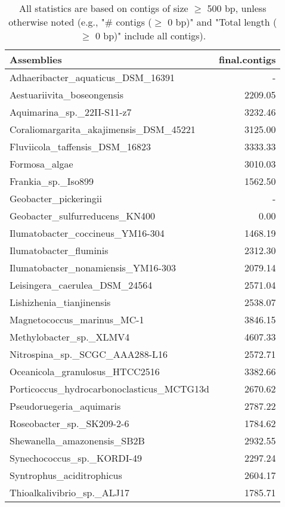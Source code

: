 \documentclass[12pt,a4paper]{article}
\begin{document}
\begin{table}[ht]
\begin{center}
\caption{All statistics are based on contigs of size $\geq$ 500 bp, unless otherwise noted (e.g., "\# contigs ($\geq$ 0 bp)" and "Total length ($\geq$ 0 bp)" include all contigs).}
\begin{tabular}{|l*{1}{|r}|}
\hline
Assemblies & final.contigs \\ \hline
Adhaeribacter\_aquaticus\_DSM\_16391 & - \\ \hline
Aestuariivita\_boseongensis & 2209.05 \\ \hline
Aquimarina\_sp.\_22II-S11-z7 & 3232.46 \\ \hline
Coraliomargarita\_akajimensis\_DSM\_45221 & 3125.00 \\ \hline
Fluviicola\_taffensis\_DSM\_16823 & 3333.33 \\ \hline
Formosa\_algae & 3010.03 \\ \hline
Frankia\_sp.\_Iso899 & 1562.50 \\ \hline
Geobacter\_pickeringii & - \\ \hline
Geobacter\_sulfurreducens\_KN400 & 0.00 \\ \hline
Ilumatobacter\_coccineus\_YM16-304 & 1468.19 \\ \hline
Ilumatobacter\_fluminis & 2312.30 \\ \hline
Ilumatobacter\_nonamiensis\_YM16-303 & 2079.14 \\ \hline
Leisingera\_caerulea\_DSM\_24564 & 2571.04 \\ \hline
Lishizhenia\_tianjinensis & 2538.07 \\ \hline
Magnetococcus\_marinus\_MC-1 & 3846.15 \\ \hline
Methylobacter\_sp.\_XLMV4 & 4607.33 \\ \hline
Nitrospina\_sp.\_SCGC\_AAA288-L16 & 2572.71 \\ \hline
Oceanicola\_granulosus\_HTCC2516 & 3382.66 \\ \hline
Porticoccus\_hydrocarbonoclasticus\_MCTG13d & 2670.62 \\ \hline
Pseudoruegeria\_aquimaris & 2787.22 \\ \hline
Roseobacter\_sp.\_SK209-2-6 & 1784.62 \\ \hline
Shewanella\_amazonensis\_SB2B & 2932.55 \\ \hline
Synechococcus\_sp.\_KORDI-49 & 2297.24 \\ \hline
Syntrophus\_aciditrophicus & 2604.17 \\ \hline
Thioalkalivibrio\_sp.\_ALJ17 & 1785.71 \\ \hline

\end{tabular}
\end{center}
\end{table}
\end{document}
